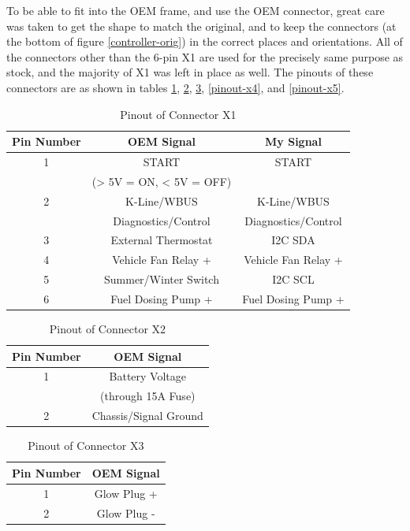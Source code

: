 \documentclass[lettersize,journal]{IEEEtran}
\begin{document}
To be able to fit into the OEM frame, and use the OEM connector, great care was taken to get the shape to match the original, and to keep the connectors (at the bottom of figure \ref{controller-orig}) in the correct places and orientations.  All of the connectors other than the 6-pin X1 are used for the precisely same purpose as stock, and the majority of X1 was left in place as well.  The pinouts of these connectors are as shown in tables \ref{pinout-x1}, \ref{pinout-x2}, \ref{pinout-x3}, \ref{pinout-x4}, and \ref{pinout-x5}.

\begin{table}
\begin{center}
\caption{Pinout of Connector X1}
\label{pinout-x1}
\begin{tabular}{| c | c | c |}
\hline
Pin Number & OEM Signal & My Signal \\
\hline
1 & START & START \\
& (> 5V = ON, < 5V = OFF)  & \\
\hline
2 & K-Line/WBUS & K-Line/WBUS \\
&  Diagnostics/Control &  Diagnostics/Control \\
\hline
3 & External Thermostat & I2C SDA \\
\hline
4 & Vehicle Fan Relay + & Vehicle Fan Relay + \\
\hline
5 & Summer/Winter Switch & I2C SCL \\
\hline
6 & Fuel Dosing Pump + & Fuel Dosing Pump + \\
\hline
\end{tabular}
\end{center}
\end{table}

\begin{table}
\begin{center}
\caption{Pinout of Connector X2}
\label{pinout-x2}
\begin{tabular}{| c | c |}
\hline
Pin Number & OEM Signal \\
\hline
1 & Battery Voltage \\
& (through 15A Fuse) \\
\hline
2 & Chassis/Signal Ground \\
\hline
\end{tabular}
\end{center}
\end{table}

\begin{table}
\begin{center}
\caption{Pinout of Connector X3}
\label{pinout-x3}
\begin{tabular}{| c | c |}
\hline
Pin Number & OEM Signal \\
\hline
1 & Glow Plug + \\
\hline
2 & Glow Plug - \\
\hline
\end{tabular}
\end{center}
\end{table}
\end{document}
